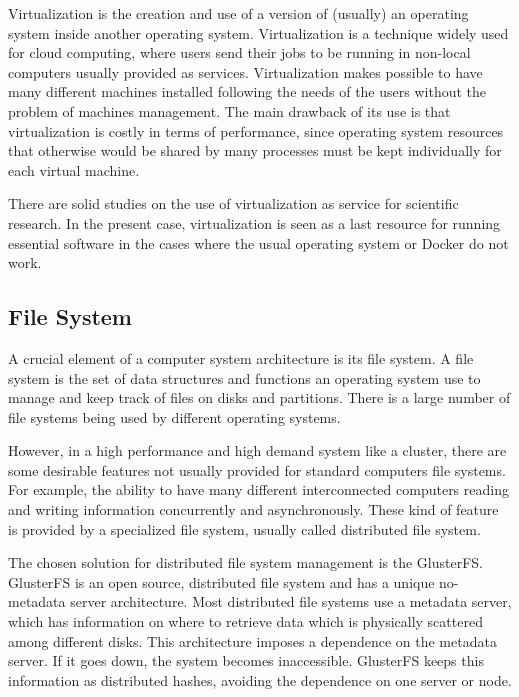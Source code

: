 \documentclass[twoside,a4paper,12pt,english]{inac17}
\begin{document}
Virtualization is the creation and use of a version of (usually) an operating system inside another operating system. Virtualization
is a technique widely used for cloud computing, where users send their jobs to be running in non-local computers usually provided
as services. Virtualization makes possible to have many different machines installed following the needs of the users without the
problem of machines management. The main drawback of its use is that virtualization is costly in terms of performance, since operating system
resources that otherwise would be shared by many processes must be kept individually for each virtual machine.

There are solid studies on the use of virtualization as service for scientific research\cite{vir1,vir2}. In the present case, virtualization
is seen as a last resource for running essential software in the cases where the usual operating system or Docker do not work.

\subsection{File System}

A crucial element of a computer system architecture is its file system. A file system is the set of data structures and functions an operating system
use to manage and keep track of files on disks and partitions. There is a large number of file systems being used by different operating systems\cite{linuxbook}.

However, in a high performance and high demand system like a cluster, there are some desirable features not usually provided for standard computers file systems.
For example, the ability to have many different interconnected computers reading and writing information concurrently and asynchronously. These kind of feature
is provided by a specialized file system, usually called distributed file system\cite{hal}.

The chosen solution for distributed file system management is the GlusterFS\cite{gluster}. GlusterFS is an open source, distributed file system and has
a unique no-metadata server architecture. Most distributed file systems use a metadata server, which has information on where to retrieve data which is
physically scattered among different disks. This architecture imposes a dependence on the metadata server. If it goes down, the system becomes inaccessible.
GlusterFS keeps this information as distributed hashes, avoiding the dependence on one server or node.
\end{document}
